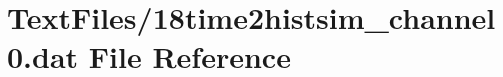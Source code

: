 \hypertarget{18time2histsim__channel0_8dat}{}\section{Text\+Files/18time2histsim\+\_\+channel0.dat File Reference}
\label{18time2histsim__channel0_8dat}
